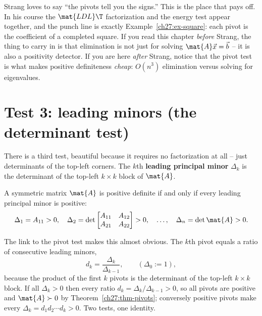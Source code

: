 \begin{strangbox}
Strang loves to say ``the pivots tell you the signs.'' This is the place that pays off. In his
course the $\mat{LDL}\T$ factorization and the energy test appear together, and the punch line is
exactly Example~\ref{ch27:ex-square}: each pivot is the coefficient of a completed square. If you
read this chapter \emph{before} Strang, the thing to carry in is that elimination is not just for
solving $\mat{A}\vec{x}=\vec{b}$ -- it is also a positivity detector. If you are here \emph{after}
Strang, notice that the pivot test is what makes positive definiteness \emph{cheap}: $O(n^3)$
elimination versus solving for eigenvalues.
\end{strangbox}

\section{Test 3: leading minors (the determinant test)}

There is a third test, beautiful because it requires no factorization at all -- just determinants of
the top-left corners. The $k$th \textbf{leading principal minor} $\Delta_k$ is the determinant of the
top-left $k\times k$ block of $\mat{A}$.

\begin{theorem}
\label{ch27:thm-sylvester}
A symmetric matrix $\mat{A}$ is positive definite if and only if every leading principal minor is
positive:
\[
  \Delta_1 = A_{11} > 0,\quad
  \Delta_2 = \det\begin{bmatrix} A_{11} & A_{12} \\ A_{21} & A_{22}\end{bmatrix} > 0,\quad
  \dots,\quad
  \Delta_n = \det\mat{A} > 0.
\]
\end{theorem}

The link to the pivot test makes this almost obvious. The $k$th pivot equals a ratio of consecutive
leading minors,
\[
  d_k = \frac{\Delta_k}{\Delta_{k-1}}, \qquad (\Delta_0 := 1),
\]
because the product of the first $k$ pivots is the determinant of the top-left $k\times k$ block.
If all $\Delta_k > 0$ then every ratio $d_k = \Delta_k/\Delta_{k-1} > 0$, so all pivots are
positive and $\mat{A}\succ 0$ by Theorem~\ref{ch27:thm-pivots}; conversely positive pivots make
every $\Delta_k = d_1 d_2\cdots d_k > 0$. Two tests, one identity.

